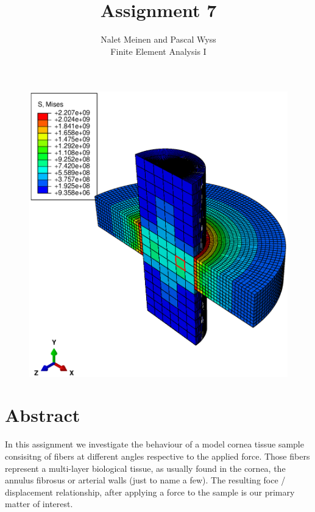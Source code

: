 \documentclass[12pt]{article}
\begin{document}


\title{Assignment 7}%
\author{Nalet Meinen and Pascal Wyss\\ %
Finite Element Analysis I
}
\maketitle

\begin{figure}[!htb]
  \centering
  \vspace*{1cm}
  \includegraphics[trim={1cm 2cm 2cm 2cm},clip,width=1.0\linewidth]{pics/stress3d}
  \label{fig:0}
\end{figure}

\newpage

\section*{Abstract}
In this assignment we investigate the behaviour of a model cornea tissue sample 
consisitng of fibers at different angles
respective to the applied force. Those fibers represent a multi-layer biological
tissue, as usually found in the cornea, the annulus fibrosus or arterial walls (just to name a few).
The resulting foce / displacement relationship, after applying a force to the sample is our primary
matter of interest.
\end{document}
